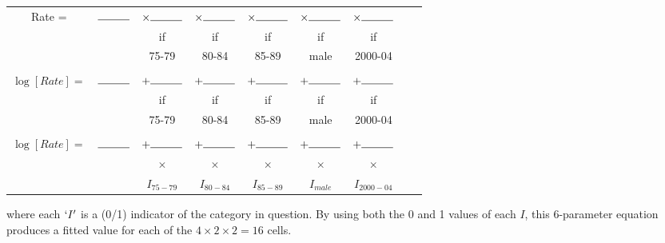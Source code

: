 \documentclass[landscape,twocolumn,letterpaper,9pt,reqno]{article}\usepackage[]{graphicx}\usepackage[]{color}
\begin{document}
\begin{tabular}{c c c c c c c c c}
	Rate = & $\rule{1cm}{0.15mm}$ & $\times \rule{1cm}{0.15mm}$ & $\times \rule{1cm}{0.15mm}$ & $\times \rule{1cm}{0.15mm}$ & $\times \rule{1cm}{0.15mm}$ & $\times \rule{1cm}{0.15mm}$ \\
	& &   if  &  if &  if & if & if & \\
	& &  75-79 & 80-84 & 85-89 & male & 2000-04 \\  \\
	$\log[Rate] =$ & $\rule{1cm}{0.15mm}$ & $+ \rule{1cm}{0.15mm}$ & $+ \rule{1cm}{0.15mm}$ & $+ \rule{1cm}{0.15mm}$ & $+ \rule{1cm}{0.15mm}$ & $+ \rule{1cm}{0.15mm}$ \\
	& &   if  &  if &  if & if & if & \\
	& &  75-79 & 80-84 & 85-89 & male & 2000-04 \\ \\
	
	$\log[Rate] =$ &$\rule{1cm}{0.15mm}$& $+  \rule{1cm}{0.15mm}$ & $+   \rule{1cm}{0.15mm}$ & $+   \rule{1cm}{0.15mm}$ & $+   \rule{1cm}{0.15mm} $ & $+ \rule{1cm}{0.15mm}$ \\
	& &  $\times$  &  $\times$ &  $\times$ & $\times$ & $\times$ & \\
	& &  $I_{75-79}$ & $I_{80-84}$ & $I_{85-89}$ & $I_{male}$ & $I_{2000-04}$ \\
\end{tabular}

where each $`I'$ is a (0/1) indicator of the category in question. By using both the 0 and 1 values of each $I$, this 6-parameter equation  produces a fitted value for each of the $4\times2\times2=16$ cells.



	
\end{document}
